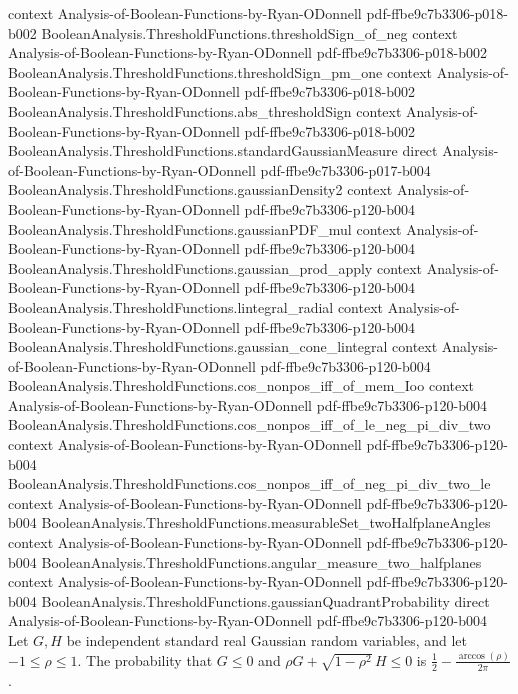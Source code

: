\begin{theorem}
  {context}
  {Analysis-of-Boolean-Functions-by-Ryan-ODonnell}
  {pdf-ffbe9c7b3306-p018-b002}
\proofstep
  {BooleanAnalysis.ThresholdFunctions.thresholdSign_of_neg}
  {context}
  {Analysis-of-Boolean-Functions-by-Ryan-ODonnell}
  {pdf-ffbe9c7b3306-p018-b002}
\proofstep
  {BooleanAnalysis.ThresholdFunctions.thresholdSign_pm_one}
  {context}
  {Analysis-of-Boolean-Functions-by-Ryan-ODonnell}
  {pdf-ffbe9c7b3306-p018-b002}
\proofstep
  {BooleanAnalysis.ThresholdFunctions.abs_thresholdSign}
  {context}
  {Analysis-of-Boolean-Functions-by-Ryan-ODonnell}
  {pdf-ffbe9c7b3306-p018-b002}
\proofstep
  {BooleanAnalysis.ThresholdFunctions.standardGaussianMeasure}
  {direct}
  {Analysis-of-Boolean-Functions-by-Ryan-ODonnell}
  {pdf-ffbe9c7b3306-p017-b004}
\proofstep
  {BooleanAnalysis.ThresholdFunctions.gaussianDensity2}
  {context}
  {Analysis-of-Boolean-Functions-by-Ryan-ODonnell}
  {pdf-ffbe9c7b3306-p120-b004}
\proofstep
  {BooleanAnalysis.ThresholdFunctions.gaussianPDF_mul}
  {context}
  {Analysis-of-Boolean-Functions-by-Ryan-ODonnell}
  {pdf-ffbe9c7b3306-p120-b004}
\proofstep
  {BooleanAnalysis.ThresholdFunctions.gaussian_prod_apply}
  {context}
  {Analysis-of-Boolean-Functions-by-Ryan-ODonnell}
  {pdf-ffbe9c7b3306-p120-b004}
\proofstep
  {BooleanAnalysis.ThresholdFunctions.lintegral_radial}
  {context}
  {Analysis-of-Boolean-Functions-by-Ryan-ODonnell}
  {pdf-ffbe9c7b3306-p120-b004}
\proofstep
  {BooleanAnalysis.ThresholdFunctions.gaussian_cone_lintegral}
  {context}
  {Analysis-of-Boolean-Functions-by-Ryan-ODonnell}
  {pdf-ffbe9c7b3306-p120-b004}
\proofstep
  {BooleanAnalysis.ThresholdFunctions.cos_nonpos_iff_of_mem_Ioo}
  {context}
  {Analysis-of-Boolean-Functions-by-Ryan-ODonnell}
  {pdf-ffbe9c7b3306-p120-b004}
\proofstep
  {BooleanAnalysis.ThresholdFunctions.cos_nonpos_iff_of_le_neg_pi_div_two}
  {context}
  {Analysis-of-Boolean-Functions-by-Ryan-ODonnell}
  {pdf-ffbe9c7b3306-p120-b004}
\proofstep
  {BooleanAnalysis.ThresholdFunctions.cos_nonpos_iff_of_neg_pi_div_two_le}
  {context}
  {Analysis-of-Boolean-Functions-by-Ryan-ODonnell}
  {pdf-ffbe9c7b3306-p120-b004}
\proofstep
  {BooleanAnalysis.ThresholdFunctions.measurableSet_twoHalfplaneAngles}
  {context}
  {Analysis-of-Boolean-Functions-by-Ryan-ODonnell}
  {pdf-ffbe9c7b3306-p120-b004}
\proofstep
  {BooleanAnalysis.ThresholdFunctions.angular_measure_two_halfplanes}
  {context}
  {Analysis-of-Boolean-Functions-by-Ryan-ODonnell}
  {pdf-ffbe9c7b3306-p120-b004}
\proofstep
  {BooleanAnalysis.ThresholdFunctions.gaussianQuadrantProbability}
  {direct}
  {Analysis-of-Boolean-Functions-by-Ryan-ODonnell}
  {pdf-ffbe9c7b3306-p120-b004}
Let $G,H$ be independent standard real Gaussian random variables, and let
$-1\le\rho\le1$. The probability that $G\le0$ and $\rho G+\sqrt{1-\rho^2}\,H\le0$ is
$\frac12-\frac{\arccos(\rho)}{2\pi}$.
\end{theorem}

